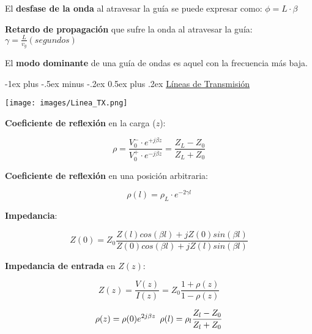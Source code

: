 \documentclass[10pt,landscape]{article}
\makeatletter
\renewcommand{\section}{\@startsection{section}{1}{0mm}%
                                {-1ex plus -.5ex minus -.2ex}%
                                {0.5ex plus .2ex}%
                                {\normalfont\large\bfseries}}
\makeatother
\begin{document}
\begin{multicols}{3}
El \textbf{desfase de la onda} al atravesar la guía se puede expresar como: $\phi = L \cdot \beta$

\textbf{Retardo de propagación} que sufre la onda al atravesar la guía: $\gamma = \frac{L}{v_{g}} (segundos)$

El \textbf{modo dominante} de una guía de ondas es aquel con la frecuencia más baja.


                                                              

\section{\underline{Líneas de Transmisión}}

\begin{center}
	\texttt{[image: images/Linea\_TX.png]}
\end{center}

\textbf{Coeficiente de reflexión} en la carga ($z$): 

\begin{equation*}
	\rho = \frac{V_0^- \cdot e^{+ j \beta z}}{V_0^+ \cdot e^{-j \beta z}} = \frac{Z_L - Z_0}{Z_L + Z_0}
\end{equation*}

\textbf{Coeficiente de reflexión} en una posición arbitraria:

\begin{equation*}
	\rho(l) = \rho_L \cdot e^{-2 \gamma l}
\end{equation*}

\textbf{Impedancia}:

\begin{equation*}
	Z(0) = Z_0 \frac{Z(l) cos(\beta l) + j Z(0) sin(\beta l)}{Z(0) cos(\beta l) + j Z(l) sin(\beta l)}
\end{equation*}

\textbf{Impedancia de entrada} en $Z(z)$:

\begin{equation*}
	Z(z) = \frac{V(z)}{I(z)} = Z_0 \frac{1 + \rho(z)}{1 - \rho(z)}
\end{equation*}

\begin{equation*}
	\rho(z) = \rho(0) e^{2 j \beta z} \hspace{5 pt} \rho(l) = \rho_l \frac{Z_l - Z_0}{Z_l + Z_0}
\end{equation*}


\end{multicols}
\end{document}
